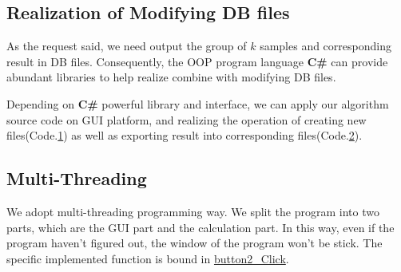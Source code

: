 \subsection{Realization of Modifying DB files}

As the request said, we need output the group of $k$ samples and corresponding result in DB files.
Consequently, the OOP program language \textbf{C\#} can provide abundant libraries
to help realize combine with modifying DB files.

Depending on \textbf{C\#} powerful library and interface, we can apply our algorithm source code on GUI platform,
and realizing the operation of creating new files(Code.\hyperref[code:create]{1}) 
as well as exporting result into corresponding files(Code.\hyperref[code:insert]{2}).  
\label{code:create}
\label{code:insert}

\subsection{Multi-Threading}
    
We adopt multi-threading programming way. We split the program into two parts, which are the GUI part and the 
calculation part. In this way, even if the program haven't figured out, the window of the program won't be stick.
The specific implemented function is bound in \hyperref[code:multi]{button2\_Click}.
\label{code:multi}

    
